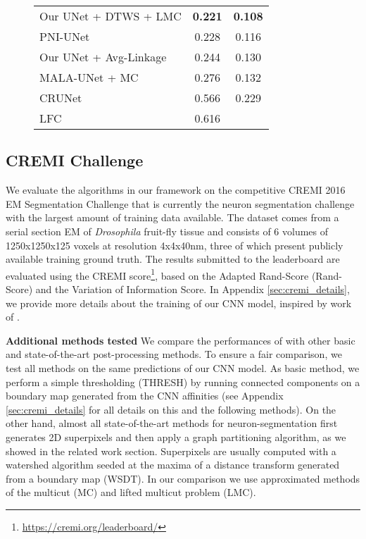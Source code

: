 \begin{figure}
\begin{minipage}[T]{0.48\textwidth}
\begin{tabular}{l|c|c}
Our UNet + DTWS + LMC &  \textbf{0.221} & \textbf{0.108}\\
PNI-UNet & 0.228 & 0.116 \\
Our UNet + \algname{} Avg-Linkage & 0.244 & 0.130 \\
MALA-UNet + MC \cite{funke2018large} & 0.276 & 0.132 \\
CRUNet \cite{zeng2017deepem3d} & 0.566 & 0.229 \\
LFC \cite{parag2017anisotropic} & 0.616 & \\
        \end{tabular}
    \label{tab:results_cremi_test}
\end{minipage}
\end{figure}

\subsection{CREMI Challenge} \label{sec:cremi_challenge}
We evaluate the algorithms in our framework on the competitive CREMI 2016 EM Segmentation Challenge \cite{cremiChallenge} that is currently the neuron segmentation challenge with the largest amount of training data available. The dataset comes from a serial section EM of \emph{Drosophila} fruit-fly tissue and consists of 6 volumes of 1250x1250x125 voxels at resolution 4x4x40nm, three of which present publicly available training ground truth. The results submitted to the leaderboard are evaluated using the CREMI score\footnote{\url{https://cremi.org/leaderboard/}}, based on the Adapted Rand-Score (Rand-Score) and the Variation of Information Score\cite{arganda2015crowdsourcing}. In Appendix \ref{sec:cremi_details}, we provide more details about the training of our CNN model, inspired by work of \cite{lee2017superhuman,funke2018large}.


\textbf{Additional methods tested } We compare the performances of \algname{} with other basic and state-of-the-art post-processing methods. To ensure a fair comparison, we test all methods on the same predictions of our CNN model. As basic method, we perform a simple thresholding (THRESH) by running connected components on a boundary map generated from the CNN affinities (see Appendix \ref{sec:cremi_details} for all details on this and the following methods). On the other hand, almost all state-of-the-art methods for neuron-segmentation first generates 2D superpixels and then apply a graph partitioning algorithm, as we showed in the related work section. Superpixels are usually computed with a watershed algorithm seeded at the maxima of a distance transform generated from a boundary map (WSDT). In our comparison we use approximated methods of the multicut (MC) and lifted multicut problem (LMC).



